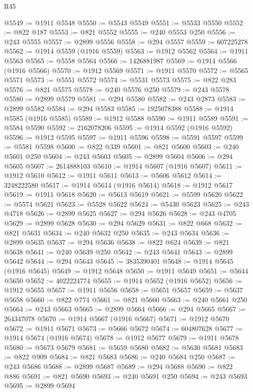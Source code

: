 \begin{lexlean}{R45}
\begin{coremodule}
{@5549 := @1911 @5548
@5550 := @5543 @5549
@5551 := @5533 @5550
@5552 := @822 @187
@5553 := @821 @5552
@5555 := @240 @5553 @250
@5556 := @243 @5555
@5557 := @2899 @5556
@5558 := @294 @5557
@5559 := 607225278
@5562 := @1914 @5559 (@1916 @5559)
@5563 := @1912 @5562
@5564 := @1911 @5563
@5565 := @5558 @5564
@5566 := 1426881987
@5569 := @1914 @5566 (@1916 @5566)
@5570 := @1912 @5569
@5571 := @1911 @5570
@5572 := @5565 @5571
@5573 := @5551 @5572
@5574 := @5531 @5573
@5575 := @822 @283
@5576 := @821 @5575
@5578 := @240 @5576 @250
@5579 := @243 @5578
@5580 := @2899 @5579
@5581 := @294 @5580
@5582 := @243 @2873
@5583 := @2899 @5582
@5584 := @294 @5583
@5585 := 1925078388
@5588 := @1914 @5585 (@1916 @5585)
@5589 := @1912 @5588
@5590 := @1911 @5589
@5591 := @5584 @5590
@5592 := 2162078206
@5595 := @1914 @5592 (@1916 @5592)
@5596 := @1912 @5595
@5597 := @1911 @5596
@5598 := @5591 @5597
@5599 := @5581 @5598
@5600 := @822 @339
@5601 := @821 @5600
@5603 := @240 @5601 @250
@5604 := @243 @5603
@5605 := @2899 @5604
@5606 := @294 @5605
@5607 := 2614888103
@5610 := @1914 @5607 (@1916 @5607)
@5611 := @1912 @5610
@5612 := @1911 @5611
@5613 := @5606 @5612
@5614 := 3248222580
@5617 := @1914 @5614 (@1916 @5614)
@5618 := @1912 @5617
@5619 := @1911 @5618
@5620 := @5613 @5619
@5621 := @5599 @5620
@5622 := @5574 @5621
@5623 := @5528 @5622
@5624 := @5430 @5623
@5625 := @243 @4718
@5626 := @2899 @5625
@5627 := @294 @5626
@5628 := @243 @4705
@5629 := @2899 @5628
@5630 := @294 @5629
@5631 := @822 @668
@5632 := @821 @5631
@5634 := @240 @5632 @250
@5635 := @243 @5634
@5636 := @2899 @5635
@5637 := @294 @5636
@5638 := @822 @624
@5639 := @821 @5638
@5641 := @240 @5639 @250
@5642 := @243 @5641
@5643 := @2899 @5642
@5644 := @294 @5643
@5645 := 3835390401
@5648 := @1914 @5645 (@1916 @5645)
@5649 := @1912 @5648
@5650 := @1911 @5649
@5651 := @5644 @5650
@5652 := 4022224774
@5655 := @1914 @5652 (@1916 @5652)
@5656 := @1912 @5655
@5657 := @1911 @5656
@5658 := @5651 @5657
@5659 := @5637 @5658
@5660 := @822 @774
@5661 := @821 @5660
@5663 := @240 @5661 @250
@5664 := @243 @5663
@5665 := @2899 @5664
@5666 := @294 @5665
@5667 := 264347078
@5670 := @1914 @5667 (@1916 @5667)
@5671 := @1912 @5670
@5672 := @1911 @5671
@5673 := @5666 @5672
@5674 := 604807628
@5677 := @1914 @5674 (@1916 @5674)
@5678 := @1912 @5677
@5679 := @1911 @5678
@5680 := @5673 @5679
@5681 := @5659 @5680
@5682 := @5630 @5681
@5683 := @822 @909
@5684 := @821 @5683
@5686 := @240 @5684 @250
@5687 := @243 @5686
@5688 := @2899 @5687
@5689 := @294 @5688
@5690 := @822 @886
@5691 := @821 @5690
@5693 := @240 @5691 @250
@5694 := @243 @5693
@5695 := @2899 @5694
}
\end{coremodule}
\end{lexlean}
